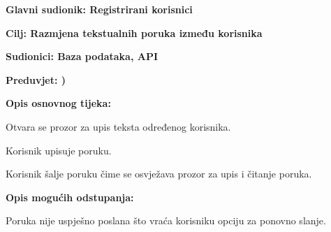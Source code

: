 					\noindent {}
					\begin{packed_item}
						
						\item \textbf{Glavni sudionik: Registrirani korisnici}
						\item  \textbf{Cilj: Razmjena tekstualnih poruka između korisnika} 
						\item  \textbf{Sudionici: Baza podataka, API} 
						\item  \textbf{Preduvjet: )} 
						\item  \textbf{Opis osnovnog tijeka:}
						
						\item[] \begin{packed_enum}
							
							\item Otvara se prozor za upis teksta određenog korisnika.
							\item Korisnik upisuje poruku.
							\item Korisnik šalje poruku čime se osvježava prozor za upis i čitanje poruka.
							 
						\end{packed_enum}
						
						\item  \textbf{Opis mogućih odstupanja:}
						
						\item[] \begin{packed_item}
							
							\item[3.a] Poruka nije uspješno poslana što vraća korisniku opciju za ponovno slanje.
							
						\end{packed_item}
					\end{packed_item}
					
